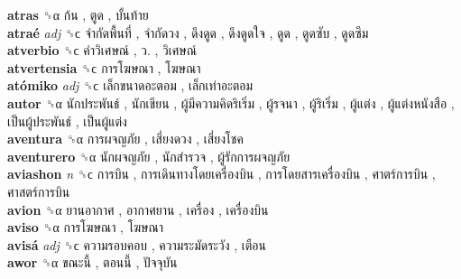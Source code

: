 \textbf{atras} ␝α   ก้น ,  ตูด ,  บั้นท้าย   \\
\textbf{atraé} \emph{adj}  ␝ϲ   จำกัดพื้นที่ ,  จำกัดวง ,  ดึงดูด ,  ดึงดูดใจ ,  ดูด ,  ดูดซับ ,  ดูดซึม   \\
\textbf{atverbio} ␝ϲ   คำวิเศษณ์ ,  ว. ,  วิเศษณ์   \\
\textbf{atvertensia} ␝ϲ   การโฆษณา ,  โฆษณา   \\
\textbf{atómiko} \emph{adj}  ␝ϲ   เล็กขนาดอะตอม ,  เล็กเท่าอะตอม   \\
\textbf{autor} ␝α   นักประพันธ์ ,  นักเขียน ,  ผู้มีความคิดริเริ่ม ,  ผู้รจนา ,  ผู้ริเริ่ม ,  ผู้แต่ง ,  ผู้แต่งหนังสือ ,  เป็นผู้ประพันธ์ ,  เป็นผู้แต่ง   \\
\textbf{aventura} ␝α   การผจญภัย ,  เสี่ยงดวง ,  เสี่ยงโชค   \\
\textbf{aventurero} ␝α   นักผจญภัย ,  นักสำรวจ ,  ผู้รักการผจญภัย   \\
\textbf{aviashon} \emph{n}  ␝ϲ   การบิน ,  การเดินทางโดยเครื่องบิน ,  การโดยสารเครื่องบิน ,  ศาตร์การบิน ,  ศาสตร์การบิน   \\
\textbf{avion} ␝α   ยานอากาศ ,  อากาศยาน ,  เครื่อง ,  เครื่องบิน   \\
\textbf{aviso} ␝α   การโฆษณา ,  โฆษณา   \\
\textbf{avisá} \emph{adj}  ␝ϲ   ความรอบคอบ ,  ความระมัดระวัง ,  เตือน   \\
\textbf{awor} ␝α   ขณะนี้ ,  ตอนนี้ ,  ปัจจุบัน   \\
